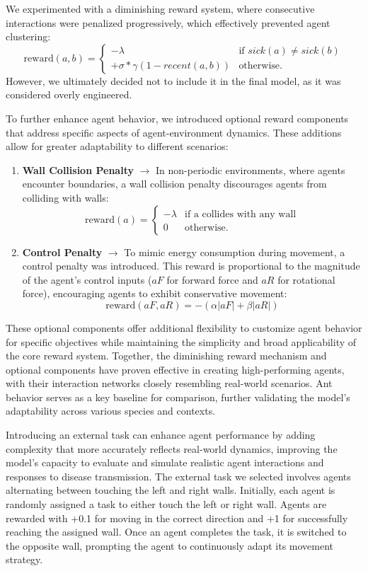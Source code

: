 \documentclass[9pt]{IEEEtran}
\begin{document}
We experimented with a diminishing reward system, where consecutive interactions were penalized progressively, which effectively prevented agent clustering: 
$$
\mathrm{reward}(a, b) = \begin{cases}
    -\lambda & \text{if } sick(a) \neq sick(b) \\ 
    +\sigma * \gamma (1 - recent(a,b)) & \text{otherwise.}
\end{cases}
$$
However, we ultimately decided not to include it in the final model, as it was considered overly engineered. 

To further enhance agent behavior, we introduced optional reward components that address specific aspects of agent-environment dynamics. These additions allow for greater adaptability to different scenarios:

\begin{enumerate}
    \item \textbf{Wall Collision Penalty} $\rightarrow$ In non-periodic environments, where agents encounter boundaries, a wall collision penalty discourages agents from colliding with walls:
    $$
    \mathrm{reward}(a) = \begin{cases}
        -\lambda & \text{if a collides with any wall}\\ 
        0 & \text{otherwise.}
    \end{cases}
    $$
    \item \textbf{Control Penalty} $\rightarrow$ To mimic energy consumption during movement, a control penalty was introduced. This reward is proportional to the magnitude of the agent’s control inputs ($aF$ for forward force and $aR$ for rotational force), encouraging agents to exhibit conservative movement:
    $$
    \text{reward}(aF, aR) = -(\alpha |aF| + \beta |aR|)
    $$
\end{enumerate}

These optional components offer additional flexibility to customize agent behavior for specific objectives while maintaining the simplicity and broad applicability of the core reward system. Together, the diminishing reward mechanism and optional components have proven effective in creating high-performing agents, with their interaction networks closely resembling real-world scenarios. Ant behavior serves as a key baseline for comparison, further validating the model's adaptability across various species and contexts.

Introducing an external task can enhance agent performance by adding complexity that more accurately reflects real-world dynamics, improving the model’s capacity to evaluate and simulate realistic agent interactions and responses to disease transmission. The external task we selected involves agents alternating between touching the left and right walls. Initially, each agent is randomly assigned a task to either touch the left or right wall. Agents are rewarded with +0.1 for moving in the correct direction and +1 for successfully reaching the assigned wall. Once an agent completes the task, it is switched to the opposite wall, prompting the agent to continuously adapt its movement strategy.
\end{document}
